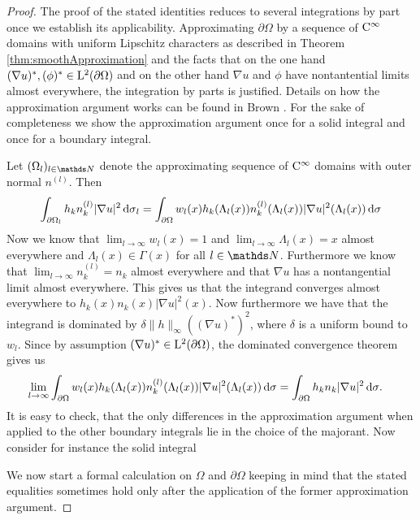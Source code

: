 \begin{proof}
  The proof of the stated identities reduces to several integrations by part  once we establish its applicability. 
  Approximating $\partial \Omega$ by a sequence of $\mathrm{C}^\infty$ domains with uniform Lipschitz characters as described in Theorem \ref{thm:smoothApproximation} and the facts that on the one hand $(\nabla u)^*, (\phi)^* \in \mathrm{L}^2(\partial\Omega)$ and on the other hand $\nabla u$ and $\phi$ have nontantential limits almost everywhere, the integration by parts is justified.
  Details on how the approximation argument works can be found in Brown \cite[Prop. 2.4]{brown}.
  For the sake of completeness we show the approximation argument once for a solid integral and once for a boundary integral.

  Let $(\Omega_l)_{l \in \N}$ denote the approximating sequence of $\mathrm{C}^\infty$ domains with outer normal $n^{(l)}$.
  Then
  \begin{align*}
    \int_{\partial\Omega_l} h_k n_k^{(l)} |\nabla u|^2 \, {\operatorname{d}\!{\sigma}}_l
    = \int_{\partial \Omega} w_l(x) h_k(\Lambda_l(x)) n_k^{(l)}(\Lambda_l(x)) |\nabla u|^2(\Lambda_l(x)) \, {\operatorname{d}\!{\sigma}}
  \end{align*}
  Now we know that $\lim_{l \to \infty} w_l(x) = 1$ and $\lim_{l \to \infty} \Lambda_l(x) = x$ almost everywhere and $\Lambda_l(x) \in \Gamma(x)$ for all $l \in \N$.
  Furthermore we know that $\lim_{l \to \infty} n_k^{(l)} = n_k$ almost everywhere and that $\nabla u$ has a nontangential limit almost everywhere.
  This gives us that the integrand converges almost everywhere to $ h_k(x) n_k(x) |\nabla u|^2(x)$.
  Now furthermore we have that the integrand is dominated by $\delta \|h\|_\infty ((\nabla u)^*)^2$, where $\delta$ is a uniform bound to $w_l$. Since by assumption $(\nabla u)^* \in \mathrm{L}^2(\partial\Omega)$, the dominated convergence theorem gives us
  \begin{align*}
    \lim_{l \to \infty} \int_{\partial \Omega} w_l(x) h_k(\Lambda_l(x)) n_k^{(l)}(\Lambda_l(x)) |\nabla u|^2(\Lambda_l(x)) \, {\operatorname{d}\!{\sigma}} 
    &= 
    \int_{\partial\Omega} h_k n_k |\nabla u|^2 \, {\operatorname{d}\!{\sigma}}.
  \end{align*}
  It is easy to check, that the only differences in the approximation argument when applied to the other boundary integrals lie in the choice of the majorant.
  Now consider for instance the solid integral

  We now start a formal calculation on $\Omega$ and $\partial\Omega$ keeping in mind that the stated equalities sometimes hold only after the application of the former approximation argument.


\end{proof}
